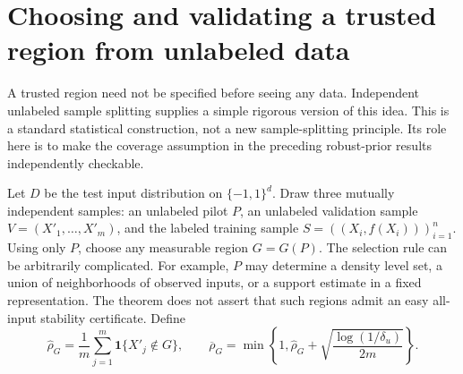\section{Choosing and validating a trusted region from unlabeled data}
\label{sec:unlabeled-trusted-region}

A trusted region need not be specified before seeing any data. Independent
unlabeled sample splitting supplies a simple rigorous version of this idea.
This is a standard statistical construction, not a new sample-splitting
principle. Its role here is to make the coverage assumption in the preceding
robust-prior results independently checkable.

Let $D$ be the test input distribution on $\{-1,1\}^d$. Draw three mutually
independent samples: an unlabeled pilot $P$, an unlabeled validation sample
$V=(X'_1,\ldots,X'_m)$, and the labeled training sample
$S=((X_i,f(X_i)))_{i=1}^n$. Using only $P$, choose any measurable region
$G=G(P)$. The selection rule can be arbitrarily complicated. For example,
$P$ may determine a density level set, a union of neighborhoods of observed
inputs, or a support estimate in a fixed representation. The theorem does
not assert that such regions admit an easy all-input stability certificate.
Define
\[
 \widehat\rho_G=\frac1m\sum_{j=1}^m\mathbf1\{X'_j\notin G\},\qquad
 \overline\rho_G=\min\!\left\{1,\widehat\rho_G+
            \sqrt{\frac{\log(1/\delta_u)}{2m}}\right\}.
\]

